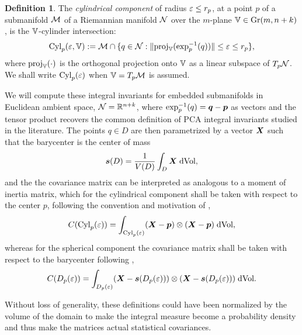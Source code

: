 \documentclass[letterpaper, reqno, 11pt]{amsart}
\theoremstyle{definition}
\newtheorem{definition}[theorem]{Definition}
\theoremstyle{remark}
\numberwithin{equation}{section}
\begin{document}
\begin{definition}
	The \emph{cylindrical component} of radius $\varepsilon\leq r_p$, at a point $p$ of a submanifold ${\mathcal M}$ of a Riemannian manifold $\mathcal{N}$ over the $m$-plane $\mathbb{V}\in\mathrm{Gr}({m},{n+k})$, is the $\mathbb{V}$-cylinder intersection:
\begin{equation}
\mathrm{Cyl}_p(\varepsilon,\mathbb{V}):={\mathcal M}\cap \{q\in\mathcal{N}: \|\mathrm{proj}_{\mathbb{V}}({\exp_p^{-1}(q)})\|\leq\varepsilon\leq r_p \}, 
\end{equation}
where $\mathrm{proj}_{\mathbb{V}}({\cdot})$ is the orthogonal projection onto $\mathbb{V}$ as a linear subspace of $T_p\mathcal{N}$. We shall write $\mathrm{Cyl}_p(\varepsilon)$ when $\mathbb{V}=T_p{\mathcal M}$ is assumed.
\end{definition}

We will compute these integral invariants for embedded submanifolds in Euclidean ambient space, $\mathcal{N}={\mathbb R}^{n+k}$, where $\exp^{-1}_p(q)=\boldsymbol{q}-\boldsymbol{p}$ as vectors and the tensor product recovers the common  definition of PCA integral invariants studied in the literature. The points $q\in D$ are then parametrized by a vector $\boldsymbol{X}$ such that the barycenter is the center of mass
	\begin{equation}
		\boldsymbol{s}(D) = \frac{1}{V(D)}\int_D \boldsymbol{X} \; \text{dVol},
	\end{equation} 
	and the the covariance matrix can be interpreted as analogous to a moment of inertia matrix, which for the cylindrical component shall be taken with respect to the center $p$, following the convention and motivation of \cite{solis2000}, 
	\begin{equation}
		C(\mathrm{Cyl}_p(\varepsilon)) =\int_{\mathrm{Cyl}_p(\varepsilon)} (\boldsymbol{X}-\boldsymbol{p})\otimes (\boldsymbol{X}-\boldsymbol{p}) \; \text{dVol},
	\end{equation} 
	whereas for the spherical component the covariance matrix shall be taken with respect to the barycenter following \cite{pottmann2007},
		\begin{equation}
		C(D_p(\varepsilon)) =\int_{D_p(\varepsilon)} (\boldsymbol{X}-\boldsymbol{s}(D_p(\varepsilon)))\otimes (\boldsymbol{X}-\boldsymbol{s}(D_p(\varepsilon))) \; \text{dVol}.
	\end{equation} 

Without loss of generality, these definitions could have been normalized by the volume of the domain to make the integral measure become a probability density and thus make the matrices actual statistical covariances.


\end{document}
